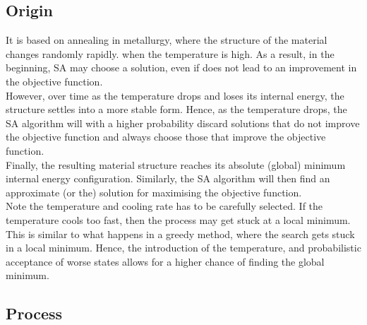 \documentclass{article}
\begin{document}
\subsection{Origin}
It is based on annealing in metallurgy, where the structure of the material changes randomly rapidly. when the temperature is high.
As a result, in the beginning, SA may choose a solution, even if does not lead to an improvement in the objective function.
\\

However, over time as the temperature drops and loses its internal energy, the structure settles into a more stable form.
Hence, as the temperature drops, the SA algorithm will with a higher probability discard solutions that do not improve the objective function and always choose those that improve the objective function.
\\

Finally, the resulting material structure reaches its absolute (global) minimum internal energy configuration.
Similarly, the SA algorithm will then find an approximate (or the) solution for maximising the objective function.
\\

Note the temperature and cooling rate has to be carefully selected.
If the temperature cools too fast, then the process may get stuck at a local minimum. 
This is similar to what happens in a greedy method, where the search gets stuck in a local minimum.
Hence, the introduction of the temperature, and probabilistic acceptance of worse states allows for a higher chance of finding the global minimum.
\\

\subsection{Process}

\end{document}
